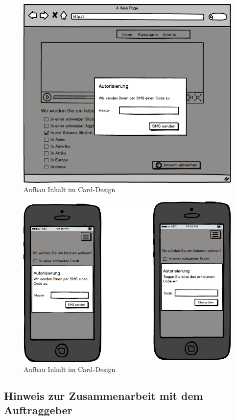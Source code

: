 \begin{figure}[htbp]
\centering
\includegraphics{images/mockups/Kundenimplementation-Desktop.png}
\caption{Aufbau Inhalt im Card-Design}
\end{figure}

\begin{figure}[htbp]
\centering
\includegraphics{images/mockups/Kundenimplementation-Mobile.png}
\caption{Aufbau Inhalt im Card-Design}
\end{figure}

\subsection{Hinweis zur Zusammenarbeit mit dem
Auftraggeber}\label{hinweis-zur-zusammenarbeit-mit-dem-auftraggeber}

